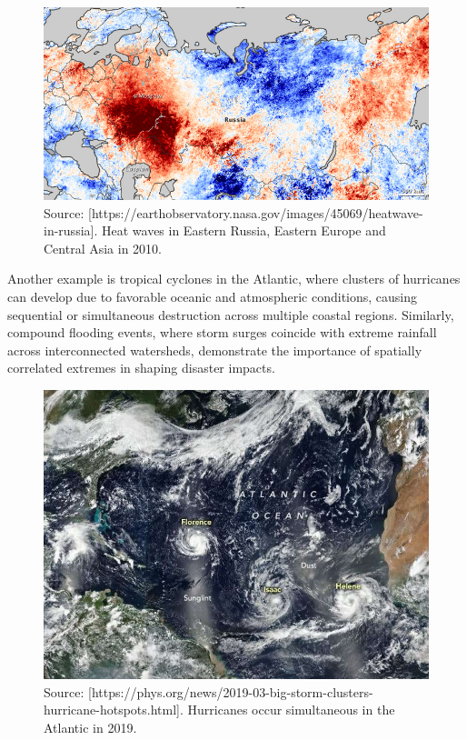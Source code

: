 \documentclass[
]{krantz}
\begin{document}
\vspace{1em}
\begin{figure}

{\centering \includegraphics[width=0.8\linewidth]{work/06-anthropo/figures/russialsta_heatwave_2010208} 

}

\caption{Source: [https://earthobservatory.nasa.gov/images/45069/heatwave-in-russia]. Heat waves in Eastern Russia, Eastern Europe and Central Asia in 2010.}\label{fig:unnamed-chunk-5}
\end{figure}
\vspace{1em}

Another example is tropical cyclones in the Atlantic, where clusters of hurricanes can develop due to favorable oceanic and atmospheric conditions, causing sequential or simultaneous destruction across multiple coastal regions. Similarly, compound flooding events, where storm surges coincide with extreme rainfall across interconnected watersheds, demonstrate the importance of spatially correlated extremes in shaping disaster impacts.

\vspace{1em}
\begin{figure}

{\centering \includegraphics[width=0.8\linewidth]{work/06-anthropo/figures/atlantic} 

}

\caption{Source: [https://phys.org/news/2019-03-big-storm-clusters-hurricane-hotspots.html]. Hurricanes occur simultaneous in the Atlantic in 2019.}\label{fig:unnamed-chunk-6}
\end{figure}
\vspace{1em}
\end{document}
